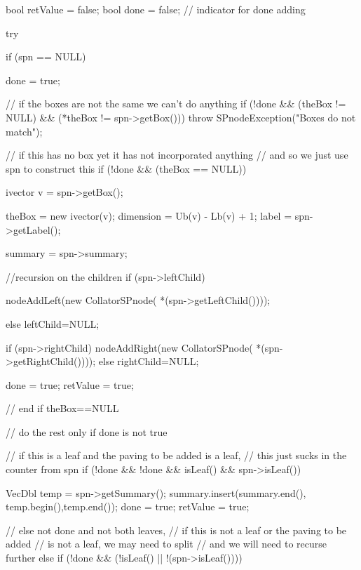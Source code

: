 \begin{DoxyCode}
    {

        bool retValue = false;
        bool done = false;  // indicator for done adding

        try {

            if (spn == NULL) {
                done = true;

            }

            // if the boxes are not the same we can't do anything
            if (!done && (theBox != NULL) && (*theBox != spn->getBox())) {
                throw SPnodeException("Boxes do not match");
            }

            // if this has no box yet it has not incorporated anything
            // and so we just use spn to construct this
            if (!done && (theBox == NULL)) {

                ivector v = spn->getBox();

                theBox = new ivector(v);
                dimension = Ub(v) - Lb(v) + 1;
                label = spn->getLabel();

                summary = spn->summary;

                //recursion on the children
                if (spn->leftChild) {
                    nodeAddLeft(new CollatorSPnode(
                        *(spn->getLeftChild())));

                }
                else leftChild=NULL;

                if (spn->rightChild) {
                    nodeAddRight(new CollatorSPnode(
                        *(spn->getRightChild())));
                 }
                else rightChild=NULL;

                done = true;
                retValue = true;

            } // end if theBox==NULL

            // do the rest only if done is not true

            // if this is a leaf and the paving to be added is a leaf,
            // this just sucks in the counter from spn
            if (!done && !done && isLeaf() && spn->isLeaf()) {

                VecDbl temp = spn->getSummary();
                summary.insert(summary.end(), temp.begin(),temp.end());
                done = true;
                retValue = true;

            }

            // else not done and not both leaves,
            // if this is not a leaf or the paving to be added
            // is not a leaf, we may need to split
            // and we will need to recurse further
            else if (!done && (!isLeaf() || !(spn->isLeaf()))) {

}}}
\end{DoxyCode}
